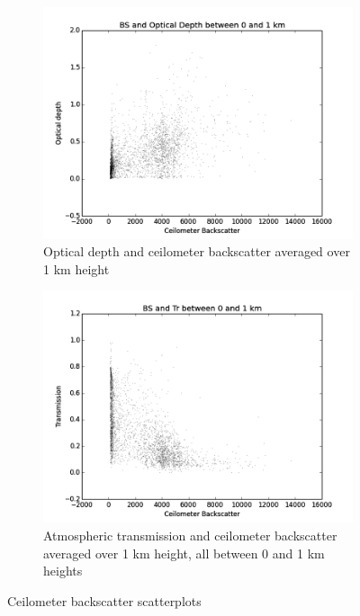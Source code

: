 \documentclass[a4paper,titlepage, twoside]{report}
\begin{document}
\begin{figure}
\begin{subfigure}{0.48\textwidth}
\end{subfigure}
\\
\begin{subfigure}{0.48\textwidth}
\includegraphics[width=\textwidth]{BS0_tau.png}
\caption{Optical depth and ceilometer backscatter averaged over 1 km height}
\end{subfigure}
\hfill
\begin{subfigure}{0.48\textwidth}
\includegraphics[width=\textwidth]{BS0_Tr.png}
\caption{Atmospheric transmission and ceilometer backscatter averaged over 1 km height, all  between 0 and 1 km heights}
\end{subfigure}
\caption{Ceilometer backscatter scatterplots}
\label{fig:data-8}
\end{figure}
\end{document}
